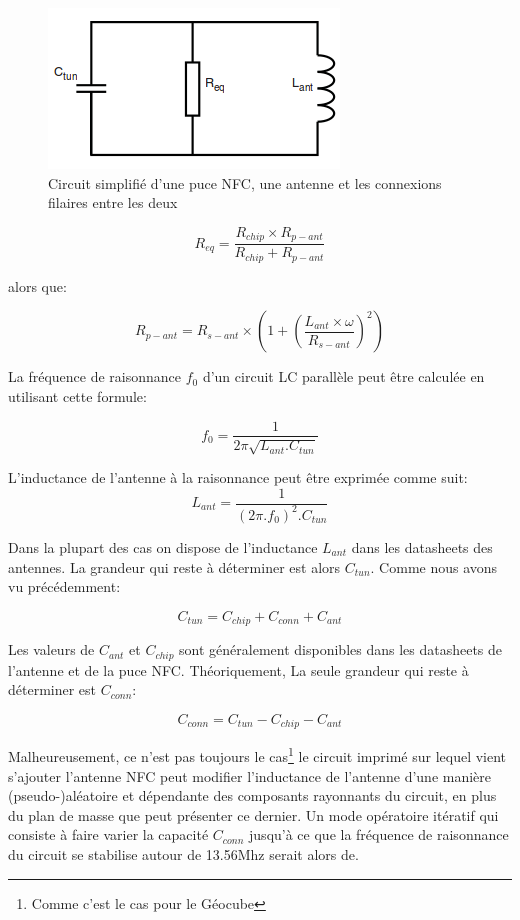 \documentclass{themeensg}
\begin{document}
\begin{figure}
\centering
\label{fig:circuiteq}
\includegraphics[scale=0.6]{images/circuiteq.png}
\caption{Circuit simplifié d'une puce NFC, une antenne et les connexions filaires entre les deux}
\end{figure}

$$R_{eq}=\frac{R_{chip}\times R_{p-ant}}{R_{chip}+R_{p-ant}}$$

alors que:

$$R_{p-ant}=R_{s-ant}\times(1+(\frac{L_{ant}\times\omega}{R_{s-ant}})^2)$$

La fréquence de raisonnance $f_0$ d'un circuit LC parallèle peut être calculée en utilisant cette formule:

$$f_0=\frac{1}{2\pi\sqrt{L_{ant}.C_{tun}}}$$

L'inductance de l'antenne à la raisonnance peut être exprimée comme suit:
$$L_{ant}=\frac{1}{(2\pi.f_0)^2.C_{tun}}$$

Dans la plupart des cas on dispose de l'inductance $L_{ant}$ dans les datasheets des antennes. La grandeur qui reste à déterminer est alors $C_{tun}$. Comme nous avons vu précédemment:

$$C_{tun}=C_{chip}+C_{conn}+C_{ant}$$

Les valeurs de $C_{ant}$ et $C_{chip}$ sont généralement disponibles dans les datasheets de l'antenne et de la puce NFC. Théoriquement, La seule grandeur qui reste à déterminer est $C_{conn}$:

$$C_{conn}=C_{tun}-C_{chip}-C_{ant}$$

Malheureusement, ce n'est pas toujours le cas\footnote{Comme c'est le cas pour le Géocube} le circuit imprimé sur lequel vient s'ajouter l'antenne NFC peut modifier l'inductance de l'antenne d'une manière (pseudo-)aléatoire et dépendante des composants rayonnants du circuit, en plus du plan de masse que peut présenter ce dernier. Un mode opératoire itératif qui consiste à faire varier la capacité $C_{conn}$ jusqu'à ce que la fréquence de raisonnance du circuit se stabilise autour de 13.56Mhz serait alors de.
\end{document}
